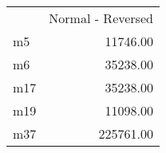 \begin{tabular}{lr}
 & Normal - Reversed \\
m5 & 11746.00 \\
m6 & 35238.00 \\
m17 & 35238.00 \\
m19 & 11098.00 \\
m37 & 225761.00 \\
\end{tabular}
